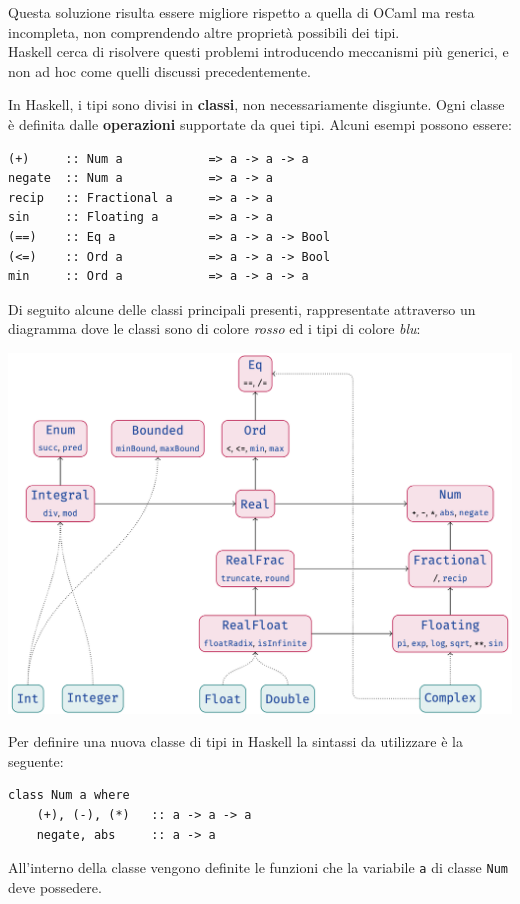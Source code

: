 \documentclass{article}
\begin{document}
Questa soluzione risulta essere migliore rispetto a quella di OCaml ma resta incompleta, non comprendendo altre proprietà possibili dei tipi.\vspace{14pt}\\
Haskell cerca di risolvere questi problemi introducendo meccanismi più generici, e non ad hoc come quelli discussi precedentemente.

In Haskell, i tipi sono divisi in \textbf{classi}, non necessariamente disgiunte. Ogni classe è definita dalle \textbf{operazioni} supportate da quei tipi. Alcuni esempi possono essere:
\begin{tcolorbox}
\begin{verbatim}
(+)     :: Num a            => a -> a -> a
negate  :: Num a            => a -> a
recip   :: Fractional a     => a -> a
sin     :: Floating a       => a -> a
(==)    :: Eq a             => a -> a -> Bool
(<=)    :: Ord a            => a -> a -> Bool
min     :: Ord a            => a -> a -> a
\end{verbatim}
\end{tcolorbox}

Di seguito alcune delle classi principali presenti, rappresentate attraverso un diagramma dove le classi sono di colore \textit{rosso} ed i tipi di colore \textit{blu}:
\begin{center}
    \includegraphics[width=\textwidth]{img/classes.png}
\end{center}

Per definire una nuova classe di tipi in Haskell la sintassi da utilizzare è la seguente:
\begin{tcolorbox}
\begin{verbatim}
class Num a where
    (+), (-), (*)   :: a -> a -> a
    negate, abs     :: a -> a
\end{verbatim}
\end{tcolorbox}
All'interno della classe vengono definite le funzioni che la variabile \texttt{a} di classe \texttt{Num} deve possedere.
\end{document}
